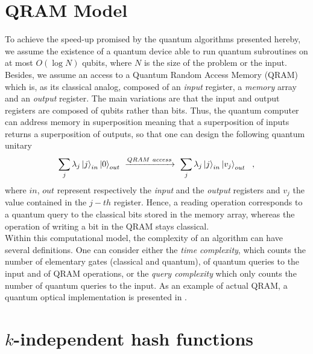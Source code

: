 \appendix

\section{QRAM Model}\label{ap:qram}

To achieve the speed-up promised by the quantum algorithms presented hereby, we assume the existence of a quantum device able to run quantum subroutines on at most $O(\log N)$ qubits, where $N$ is the size of the problem or the input. \\

Besides, we assume an access to a Quantum Random Access Memory (QRAM) which is, as its classical analog, composed of an \emph{input} register, a \emph{memory} array and an \emph{output} register. The main variations are that the input and output registers are composed of qubits rather than bits. Thus, the quantum computer can address memory in superposition meaning that a superposition of inputs returns a superposition of outputs, so that one can design the following quantum unitary
\begin{equation*}
    \sum_j \lambda_j \ket{j}_{in} \ket{0}_{out}  \ \xrightarrow{QRAM \ access} \ \sum_j \lambda_j  \ket{j}_{in} \ket{v_j}_{out}  \ \ ,
\end{equation*}
where $in$, $out$ represent respectively the \emph{input} and the \emph{output} registers and $v_j$ the value contained in the $j-th$ register. Hence, a reading operation corresponds to a quantum query to the classical bits stored in the memory array, whereas the operation of writing a bit in the QRAM stays classical.\\

Within this computational model, the complexity of an algorithm can have several definitions.  One can consider either the \emph{time complexity}, which counts the number of elementary gates (classical and quantum), of quantum queries to the input and of QRAM operations, or the \emph{query complexity} which only counts the number of quantum queries to the input. As an example of actual QRAM, a quantum optical implementation is presented in \cite{QRAM}. 


\section{$k$-independent hash functions}\label{ap:def-k-independent}


